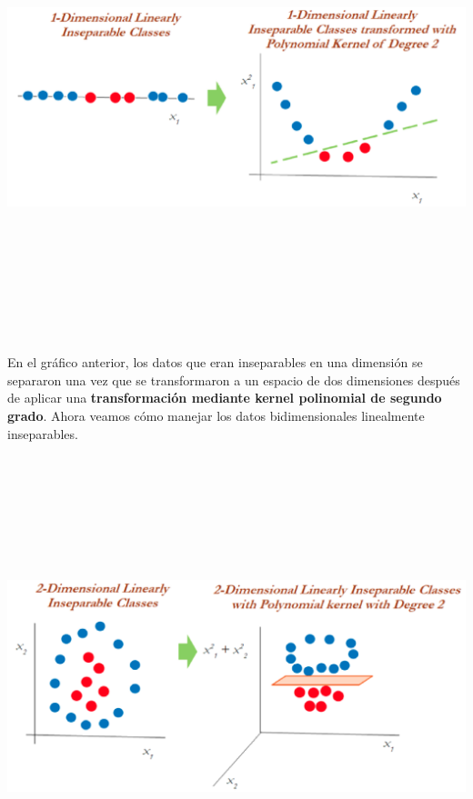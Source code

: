 \documentclass[
]{book}
\begin{document}
\begin{center}\includegraphics[width=900pt,height=380pt]{img/02-svm/04_polinomial_kernel_plot} \end{center}

En el gráfico anterior, los datos que eran inseparables en una dimensión se separaron una vez que se transformaron a un espacio de dos dimensiones después de aplicar una \textbf{transformación mediante kernel polinomial de segundo grado}. Ahora veamos cómo manejar los datos bidimensionales linealmente inseparables.

\begin{center}\includegraphics[width=900pt,height=380pt]{img/02-svm/05_kernel_polinomial_plot2} \end{center}
\end{document}
